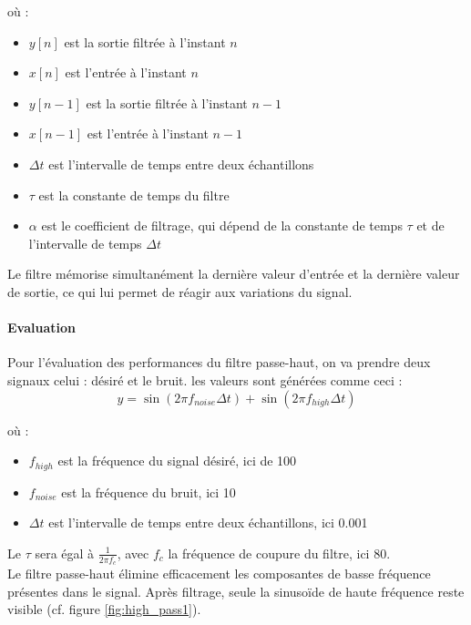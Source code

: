 où :
\begin{itemize}
    \item $y[n]$ est la sortie filtrée à l'instant $n$
    \item $x[n]$ est l'entrée à l'instant $n$
    \item $y[n-1]$ est la sortie filtrée à l'instant $n-1$
    \item $x[n-1]$ est l'entrée à l'instant $n-1$
    \item $\Delta t$ est l'intervalle de temps entre deux échantillons
    \item $\tau$ est la constante de temps du filtre
    \item $\alpha$ est le coefficient de filtrage, qui dépend de la constante de temps $\tau$ et de l'intervalle 
    de temps $\Delta t$
\end{itemize}

Le filtre mémorise simultanément la dernière valeur d'entrée et la dernière valeur de sortie, ce qui lui permet de réagir aux variations du signal. \\

\paragraph{Evaluation}

Pour l'évaluation des performances du filtre passe-haut, on va prendre deux signaux celui : désiré et le bruit. les valeurs sont générées comme ceci :
\begin{equation}
    y = \sin(2 \pi f_{noise} \Delta t) + \sin(2 \pi f_{high} \Delta t)
\end{equation}

où : 
\begin{itemize}
    \item $f_{high}$ est la fréquence du signal désiré, ici de 100
    \item $f_{noise}$ est la fréquence du bruit, ici 10
    \item $\Delta t$ est l'intervalle de temps entre deux échantillons, ici 0.001
\end{itemize}

Le $\tau$ sera égal à $\frac{1}{2 \pi f_c}$, avec $f_c$ la fréquence de coupure du filtre, ici 80. \\

Le filtre passe-haut élimine efficacement les composantes de basse fréquence présentes dans le signal. Après filtrage, seule la sinusoïde de haute fréquence reste visible (cf. figure \ref{fig:high_pass1}). \\

